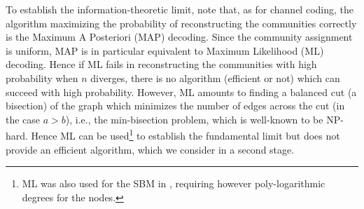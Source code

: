 \documentclass[english]{article}
\newcommand{\1}{\textbf{1}}
\begin{document}
To establish the information-theoretic limit, note that, as for channel coding, the algorithm maximizing the probability of reconstructing the communities correctly is the Maximum A Posteriori (MAP) decoding. Since the community assignment is uniform, MAP is in particular equivalent to Maximum Likelihood (ML) decoding. Hence if ML fails in reconstructing the communities with high probability when $n$ diverges, there is no algorithm (efficient or not) which can succeed with high probability. However, ML amounts to finding a balanced cut (a bisection) of the graph which minimizes the number of edges across the cut (in the case $a>b$), i.e., the min-bisection problem, which is well-known to be NP-hard. Hence ML can be used\footnote{ML was also used for the SBM in \cite{choi}, requiring however poly-logarithmic degrees for the nodes.}  to establish the fundamental limit but does not provide an efficient algorithm, which we consider in a second stage.  












\end{document}
